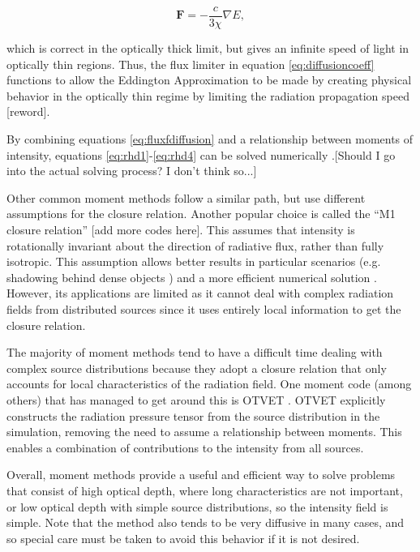 \begin{equation}
\label{eq:eddingtonrhd}
\mathbf{F} = -\frac{c}{3\chi}\nabla E,
\end{equation}

which is correct in the optically thick limit, but gives an infinite speed of light in optically thin regions. Thus, the flux limiter in equation \ref{eq:diffusioncoeff} functions to allow the Eddington Approximation to be made by creating physical behavior in the optically thin regime by limiting the radiation propagation speed [reword].

By combining equations \ref{eq:fluxfdiffusion} and a relationship between moments of intensity, equations \ref{eq:rhd1}-\ref{eq:rhd4} can be solved numerically \citep{turnerStone01}.[Should I go into the actual solving process? I don't think so...]

Other common moment methods follow a similar path, but use different assumptions for the closure relation. Another popular choice is called the ``M1 closure relation'' \citep{levermore84, skinnerOstriker13}[add more codes here]. This assumes that intensity is rotationally invariant about the direction of radiative flux, rather than fully isotropic. This assumption allows better results in particular scenarios (e.g. shadowing behind dense objects \citep{skinnerOstriker13}) and a more efficient numerical solution \citep{gonzalezEt07,aubertTeyssier08}. However, its applications are limited as it cannot deal with complex radiation fields from distributed sources since it uses entirely local information to get the closure relation.

The majority of moment methods tend to have a difficult time dealing with complex source distributions because they adopt a closure relation that only accounts for local characteristics of the radiation field. One moment code (among others) that has managed to get around this is OTVET \citep{gnedinAbel01}. OTVET explicitly constructs the radiation pressure tensor from the source distribution in the simulation, removing the need to assume a relationship between moments. This enables a combination of contributions to the intensity from all sources.

Overall, moment methods provide a useful and efficient way to solve problems that consist of high optical depth, where long characteristics are not important, or low optical depth with simple source distributions, so the intensity field is simple. Note that the method also tends to be very diffusive in many cases, and so special care must be taken to avoid this behavior if it is not desired.

